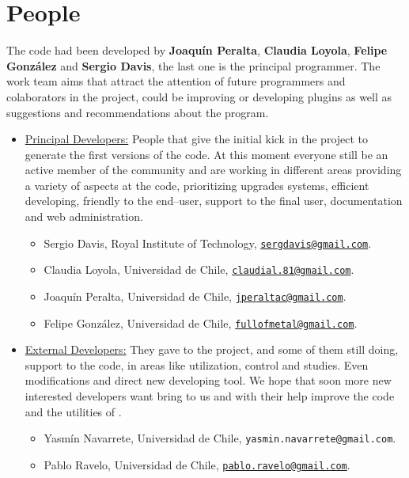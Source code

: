\chapter{People}
\label{chap:auth}

The {\lpmd} code had been developed by \textbf{Joaqu\'in Peralta},
\textbf{Claudia Loyola}, \textbf{Felipe Gonz\'alez} and \textbf{Sergio Davis},
the last one is the principal programmer. The work team aims that {\lpmd}
attract the attention of future programmers and colaborators in the project,
could be improving or developing plugins as well as suggestions and
recommendations about the program.

\begin{itemize}

\item \underline{\sc Principal Developers:} People that give the initial
kick in the project to generate the first versions of the {\lpmd} code. At this
moment everyone still be an active member of the {\lpmd} community and are
working in different areas providing a variety of aspects at the code,
prioritizing upgrades systems, efficient developing, friendly to the end--user,
support to the final user, documentation and web administration.

\begin{itemize}
 \item Sergio Davis, Royal Institute of Technology, 
 \href{http://www.lpmd.cl/sdavis/}{\tt sergdavis@gmail.com}.
 \item Claudia Loyola, Universidad de Chile, 
 \href{http://www.lpmd.cl/claudial/}{\tt claudial.81@gmail.com}.
 \item Joaqu\'in Peralta, Universidad de Chile, 
 \href{http://www.lpmd.cl/jperalta/}{\tt jperaltac@gmail.com}.
 \item Felipe Gonz\'alez, Universidad de Chile, 
  \href{http://www.gnm.cl/fgonzalez/}{\tt fullofmetal@gmail.com}.
\end{itemize}

\item \underline{\sc External Developers:} They gave to the project, and some
of them still doing,  support to the code, in areas like utilization,
control and studies. Even modifications and direct new developing tool. We hope
that soon more new interested developers want bring to us and with their help
improve the code and the utilities of {\lpmd}.

\begin{itemize}
 \item Yasm\'in Navarrete, Universidad de Chile, 
 {\tt yasmin.navarrete@gmail.com}.
 \item Pablo Ravelo, Universidad de Chile, 
 \href{http://www.gnm.cl/~pravelo/}{\tt pablo.ravelo@gmail.com}.
\end{itemize}


\end{itemize}
